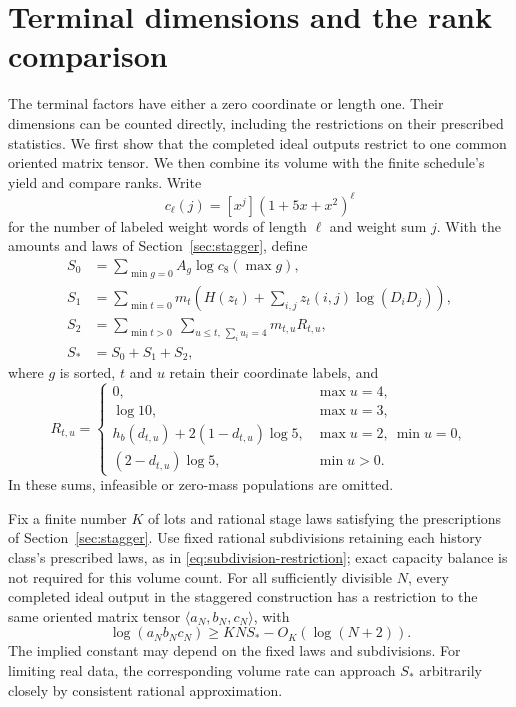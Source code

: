 \section{Terminal dimensions and the rank comparison}
\label{sec:leaf-volumes}

The terminal factors have either a zero coordinate or length one.
Their dimensions can be counted directly, including the restrictions on
their prescribed statistics.  We first show that the completed ideal
outputs restrict to one common oriented matrix tensor.  We then combine
its volume with the finite schedule's yield and compare ranks.
Write
\[
 c_\ell(j)=[x^j](1+5x+x^2)^\ell
\]
for the number of labeled weight words of length $\ell$ and weight sum $j$.
With the amounts and laws of Section~\ref{sec:stagger}, define
\begin{align}
 S_0&=\sum_{\min g=0}A_g\log c_8(\max g),
       \label{eq:leaf-s0}\\
 S_1&=\sum_{\min t=0}m_t
       \left(H(z_t)+\sum_{i,j}z_t(i,j)\log(D_iD_j)\right),
       \label{eq:leaf-s1}\\
 S_2&=\sum_{\min t>0}\ \sum_{u\leq t,\,\sum_i u_i=4}
                   m_{t,u}R_{t,u},
       \label{eq:leaf-s2}\\
 S_*&=S_0+S_1+S_2,\nonumber
\end{align}
where $g$ is sorted, $t$ and $u$ retain their coordinate labels, and
\begin{equation}
 R_{t,u}=\begin{cases}
 0,&\max u=4,\\
 \log 10,&\max u=3,\\
 h_b(d_{t,u})+2(1-d_{t,u})\log 5,
       &\max u=2,\ \min u=0,\\
 (2-d_{t,u})\log 5,&\min u>0.
 \end{cases}
 \label{eq:leaf-rates}
\end{equation}
In these sums, infeasible or zero-mass populations are omitted.

\begin{proposition}
\label{prop:leaf-volume}
Fix a finite number $K$ of lots and rational stage laws satisfying the
prescriptions of Section~\ref{sec:stagger}.  Use fixed rational
subdivisions retaining each history class's prescribed laws, as in
\eqref{eq:subdivision-restriction}; exact capacity balance is not required
for this volume count.
For all sufficiently divisible $N$, every completed ideal output in the
staggered construction has a restriction to the same oriented matrix
tensor $\langle a_N,b_N,c_N\rangle$, with
\begin{equation}
 \log(a_Nb_Nc_N)\geq KN S_*-O_K(\log(N+2)).
 \label{eq:leaf-volume-bound}
\end{equation}
The implied constant may depend on the fixed laws and subdivisions.
For limiting real data, the corresponding volume rate can approach
$S_*$ arbitrarily closely by consistent rational approximation.
\end{proposition}

